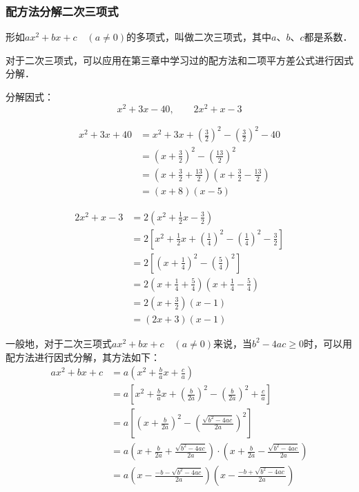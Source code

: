 \subsubsection{配方法分解二次三项式}
形如$ax^2+bx+c\quad (a\ne 0)$的多项式，叫做二次三项式，其中$a$、$b$、$c$都是系数．

对于二次三项式，可以应用在第三章中学习过的配方法和二项平方差公式进行因式分解．
\begin{example}
    分解因式：
\[x^2+3x-40,\qquad 2x^2+x-3\]
\end{example}

\begin{solution}
\[\begin{split}
    x^2+3x+40&=x^2+3x+\left(\frac{3}{2}\right)^2-\left(\frac{3}{2}\right)^2-40\\
    &=\left(x+\frac{3}{2}\right)^2-\left(\frac{13}{2}\right)^2\\
    &=\left(x+\frac{3}{2}+\frac{13}{2}\right)\left(x+\frac{3}{2}-\frac{13}{2}\right)\\
    &=(x+8)(x-5)
\end{split}\]

\[\begin{split}
    2x^2+x-3&=2\left(x^2+\frac{1}{2}x-\frac{3}{2}\right)\\
    &=2\left[x^2+\frac{1}{2}x+\left(\frac{1}{4}\right)^2-\left(\frac{1}{4}\right)^2-\frac{3}{2} \right]\\
    &=2\left[\left(x+\frac{1}{4}\right)^2-\left(\frac{5}{4}\right)^2\right]\\
    &=2\left(x+\frac{1}{4}+\frac{5}{4}\right)
   \left(x+\frac{1}{4}-\frac{5}{4}\right) \\
&=2\left(x+\frac{3}{2}\right)\left(x-1\right)\\
&=(2x+3)(x-1)
\end{split}\]
\end{solution}

一般地，对于二次三项式$ax^2+bx+c\quad (a\ne 0)$来说，当$b^2-4ac\ge 0$时，可以用配方法进行因式分解，其方法如下：
\[\begin{split}
    ax^2+bx+c &=a\left(x^2+\frac{b}{a}x+\frac{c}{a}\right)\\
    &=a\left[x^2+\frac{b}{a}x+\left(\frac{b}{2a}\right)^2-\left(\frac{b}{2a}\right)^2+\frac{c}{a}\right]\\
    &=a\left[\left(x+\frac{b}{2a}\right)^2-\left(\frac{\sqrt{b^2-4ac}}{2a}\right)^2\right]\\
    &=a\left(x+\frac{b}{2a}+\frac{\sqrt{b^2-4ac}}{2a}\right)\cdot \left(x+\frac{b}{2a}-\frac{\sqrt{b^2-4ac}}{2a}\right)\\
    &=a\left(x-\frac{-b-\sqrt{b^2-4ac}}{2a}\right)\left(x-\frac{-b+\sqrt{b^2-4ac}}{2a}\right)
\end{split}\]


